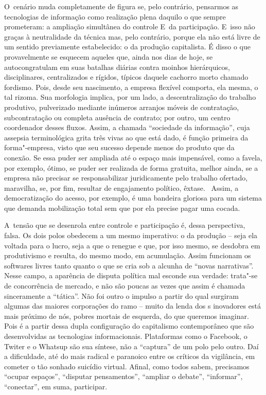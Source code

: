 O~cenário muda completamente de figura se, pelo contrário, pensarmos as
tecnologias de informação como realização plena daquilo o que sempre
prometeram: a ampliação simultânea do controle E~da participação. E~isso
não graças à neutralidade da técnica mas, pelo contrário, porque ela não
está livre de um sentido previamente estabelecido: o da produção
capitalista. É disso o que provavelmente se esquecem aqueles que, ainda
nos dias de hoje, se autocongratulam em suas batalhas diárias contra
moinhos hierárquicos, disciplinares, centralizados e rígidos, típicos
daquele cachorro morto chamado fordismo. Pois, desde seu nascimento, a
empresa flexível comporta, ela mesma, o tal rizoma. Sua morfologia
implica, por um lado, a descentralização do trabalho produtivo,
pulverizado mediante inúmeros arranjos móveis de contratação,
subcontratação ou completa ausência de contrato; por outro, um centro
coordenador desses fluxos. Assim, a chamada ``sociedade da informação'',
cuja assepsia terminológica grita três vivas ao que está dado, é função
primeira da forma"-empresa, visto que seu sucesso depende menos do
produto que da conexão. Se essa puder ser ampliada até o espaço mais
impensável, como a favela, por exemplo, ótimo, se puder ser realizada de
forma gratuita, melhor ainda, se a empresa não precisar se
responsabilizar juridicamente pelo trabalho ofertado, maravilha, se, por
fim, resultar de engajamento político, êxtase. ~Assim, a democratização
do acesso, por exemplo, é uma bandeira gloriosa para um sistema que
demanda mobilização total sem que por ela precise pagar uma cocada.

A~tensão que se desenrola entre controle e participação é, dessa
perspectiva, falsa. Os dois polos obedecem a um mesmo imperativo: o da
produção -- seja ela voltada para o lucro, seja a que o renegue e que,
por isso mesmo, se desdobra em produtivismo e resulta, do mesmo modo, em
acumulação. Assim funcionam os softwares livres tanto quanto o que se
cria sob a alcunha de ``novas narrativas''. Nesse campo, a aparência de
disputa política mal esconde sua verdade: trata"-se de concorrência de
mercado, e não são poucas as vezes que assim é chamada sinceramente a
``tática''. Não foi outro o impulso a partir do qual surgiram algumas
das maiores corporações do ramo -- muito da lenda dos s inovadores
está mais próximo de nós, pobres mortais de esquerda, do que queremos
imaginar. Pois é a partir dessa dupla configuração do capitalismo
contemporâneo que são desenvolvidas as tecnologias informacionais.
Plataformas como o Facebook, o Twiter e o Whatsup são sua síntese, não a
``captura'' de um polo pelo outro. Daí a dificuldade, até do mais
radical e paranoico entre os críticos da vigilância, em cometer o tão
sonhado suicídio virtual. Afinal, como todos sabem, precisamos ``ocupar
espaços'', ``disputar pensamentos'', ``ampliar o debate'', ``informar'',
``conectar'', em suma, participar.

